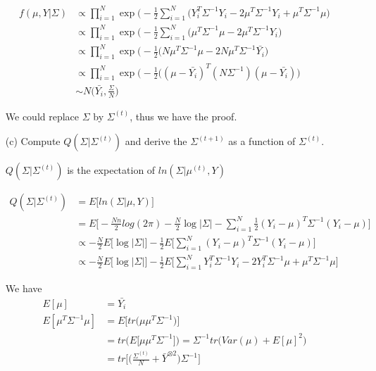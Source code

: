 \begin{itemize}
\begin{align*}
f(\mu, Y | \Sigma) & \propto \prod_{i=1}^N \exp \Big( -\frac{1}{2} \sum_{i=1}^N (Y_i^T  \Sigma^{-1} Y_i - 2 \mu^T \Sigma^{-1} Y_i + \mu^T \Sigma^{-1} \mu \Big) \\
& \propto \prod_{i=1}^N \exp \Big( -\frac{1}{2} \sum_{i=1}^N (\mu^T \Sigma^{-1} \mu - 2 \mu^T \Sigma^{-1} Y_i \Big) \\
& \propto \prod_{i=1}^N \exp \Big( -\frac{1}{2}(N \mu^T \Sigma^{-1} \mu - 2 N \mu^T \Sigma^{-1} \bar{Y_i} \Big) \\
& \propto \prod_{i=1}^N \exp \Big( -\frac{1}{2}( (\mu -  \bar{Y_i} )^T (N \Sigma^{-1}) (\mu -  \bar{Y_i} ) \Big) \\
& \sim N \Big(\bar{Y_i},  \frac{\Sigma}{N} \Big)
\end{align*}

We could replace $\Sigma$ by $\Sigma^{(t)}$, thus we have the proof.

\item[(c)] 	Compute $Q(\Sigma | \Sigma^{(t)})$ and derive the $\Sigma^{(t+1)}$ as a function of $\Sigma^{(t)}$. 

$Q(\Sigma | \Sigma^{(t)})$ is the expectation of $ln(\Sigma | \mu^{(t)}, Y) $

\begin{align*}
Q(\Sigma | \Sigma^{(t)}) &= E\Big[ ln(\Sigma | \mu, Y) \Big] \\
& = E \Big[ -\frac{Nn}{2} log (2 \pi) - \frac{N}{2} \log  \vert \Sigma \vert - \sum_{i=1}^N \frac{1}{2} (Y_i - \mu)^T \Sigma^{-1} (Y_i - \mu) \Big] \\
& \propto - \frac{N}{2}E \Big[ \log  \vert \Sigma \vert \Big] - \frac{1}{2} E \Big[ \sum_{i=1}^N  (Y_i - \mu)^T \Sigma^{-1} (Y_i - \mu)  \Big] \\
&  \propto - \frac{N}{2}E \Big[ \log  \vert \Sigma \vert \Big] - \frac{1}{2} E \Big[ \sum_{i=1}^N  Y_i^T \Sigma^{-1} Y_i - 2 Y_i^T  \Sigma^{-1}  \mu + \mu^T \Sigma^{-1} \mu \Big] 
\end{align*}

We have 
\begin{align*}
E[\mu] &= \bar{Y_i} \\
E[\mu^T \Sigma^{-1} \mu] &= E \Big[ tr \Big(  \mu \mu^T \Sigma^{-1} \Big) \Big] \\
&= tr \Big( E \Big[   \mu \mu^T \Sigma^{-1}  \Big] \Big) = \Sigma^{-1}  tr \Big( Var (\mu)  + E[\mu]^2 \Big) \\
&= tr \Big[ \Big( \frac{\Sigma^{(t)}}{N}  + \bar{Y}^{\otimes 2} \Big)\Sigma^{-1}  \Big] \\
\end{align*}


\end{itemize}
